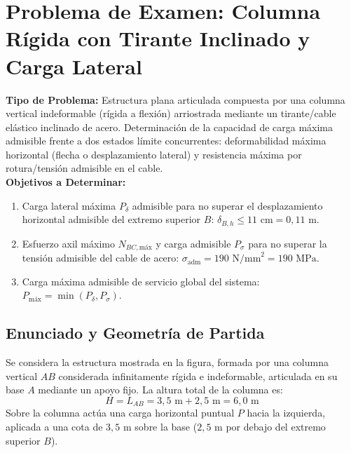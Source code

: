 \section{Problema de Examen: Columna Rígida con Tirante Inclinado y Carga Lateral}

\begin{tcolorbox}[colback=white, colframe=myb!80!black, arc=4pt, boxrule=0.9pt, left=8pt, right=8pt, top=7pt, bottom=7pt]
    \textbf{Tipo de Problema:} Estructura plana articulada compuesta por una columna vertical indeformable (rígida a flexión) arriostrada mediante un tirante/cable elástico inclinado de acero. Determinación de la capacidad de carga máxima admisible frente a dos estados límite concurrentes: deformabilidad máxima horizontal (flecha o desplazamiento lateral) y resistencia máxima por rotura/tensión admisible en el cable.\\
    \textbf{Objetivos a Determinar:}
    \begin{enumerate}
        \item Carga lateral máxima $P_{\delta}$ admisible para no superar el desplazamiento horizontal admisible del extremo superior $B$: $\delta_{B,h} \leq 11\text{ cm} = 0{,}11\text{ m}$.
        \item Esfuerzo axil máximo $N_{BC,\text{máx}}$ y carga admisible $P_{\sigma}$ para no superar la tensión admisible del cable de acero: $\sigma_{\text{adm}} = 190\text{ N/mm}^2 = 190\text{ MPa}$.
        \item Carga máxima admisible de servicio global del sistema: $P_{\text{máx}} = \min(P_{\delta}, P_{\sigma})$.
    \end{enumerate}
\end{tcolorbox}

\subsection{Enunciado y Geometría de Partida}

Se considera la estructura mostrada en la figura, formada por una columna vertical $AB$ considerada infinitamente rígida e indeformable, articulada en su base $A$ mediante un apoyo fijo. La altura total de la columna es:
\begin{equation}
    H = L_{AB} = 3{,}5\text{ m} + 2{,}5\text{ m} = 6{,}0\text{ m}
\end{equation}
Sobre la columna actúa una carga horizontal puntual $P$ hacia la izquierda, aplicada a una cota de $3{,}5\text{ m}$ sobre la base ($2{,}5\text{ m}$ por debajo del extremo superior $B$).

